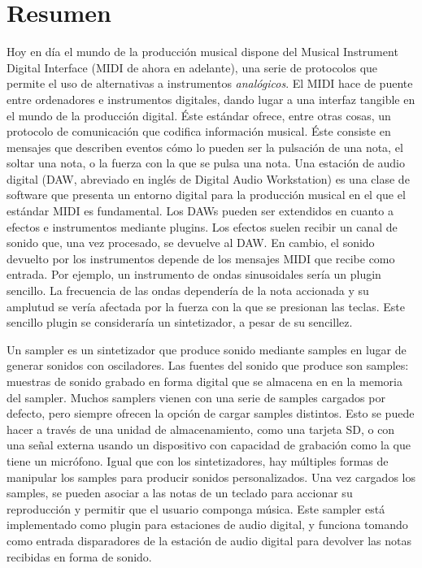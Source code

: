 \documentclass[12pt , a4paper]{article}
\begin{document}
	\section{Resumen}
	Hoy en día el mundo de la producción musical dispone del Musical Instrument Digital Interface (MIDI de ahora en adelante), una serie de protocolos que permite el uso de alternativas a instrumentos \textit{analógicos}. El MIDI hace de puente entre ordenadores e instrumentos digitales, dando lugar a una interfaz tangible en el mundo de la producción digital. Éste estándar ofrece, entre otras cosas, un protocolo de comunicación que codifica información musical. Éste consiste en mensajes que describen eventos cómo lo pueden ser la pulsación de una nota, el soltar una nota, o la fuerza con la que se pulsa una nota. Una estación de audio digital (DAW, abreviado en inglés de Digital Audio Workstation) es una clase de software que presenta un entorno digital para la producción musical en el que el estándar MIDI es fundamental. Los DAWs pueden ser extendidos en cuanto a efectos e instrumentos mediante plugins. Los efectos suelen recibir un canal de sonido que, una vez procesado, se devuelve al DAW. En cambio, el sonido devuelto por los instrumentos depende de los mensajes MIDI que recibe como entrada. Por ejemplo, un instrumento de ondas sinusoidales sería un plugin sencillo. La frecuencia de las ondas dependería de la nota accionada y su amplutud se vería afectada por la fuerza con la que se presionan las teclas. Este sencillo plugin se consideraría un sintetizador, a pesar de su sencillez.

	\par
	Un sampler es un sintetizador que produce sonido mediante samples en lugar de generar sonidos con osciladores. Las fuentes del sonido que produce son samples: muestras de sonido grabado en forma digital que se almacena en en la memoria del sampler. Muchos samplers vienen con una serie de samples cargados por defecto, pero siempre ofrecen la opción de cargar samples distintos. Esto se puede hacer a través de una unidad de almacenamiento, como una tarjeta SD, o con una señal externa usando un dispositivo con capacidad de grabación como la que tiene un micrófono. Igual que con los sintetizadores, hay múltiples formas de manipular los samples para producir sonidos personalizados. Una vez cargados los samples, se pueden asociar a las notas de un teclado para accionar su reproducción y permitir que el usuario componga música. Este sampler está implementado como plugin para estaciones de audio digital, y funciona tomando como entrada disparadores de la estación de audio digital para devolver las notas recibidas en forma de sonido. 
	
\end{document}
